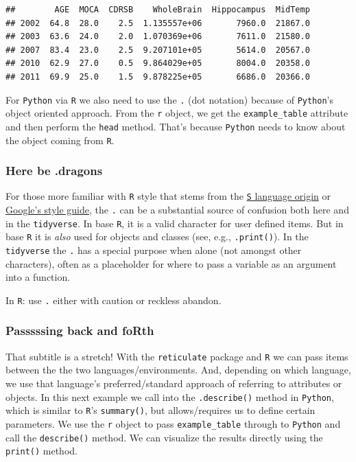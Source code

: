 \documentclass[]{article}
\begin{document}
\begin{verbatim}
##        AGE  MOCA  CDRSB    WholeBrain  Hippocampus  MidTemp
## 2002  64.8  28.0    2.5  1.135557e+06       7960.0  21867.0
## 2003  63.6  24.0    2.0  1.070369e+06       7611.0  21580.0
## 2007  83.4  23.0    2.5  9.207101e+05       5614.0  20567.0
## 2010  62.9  27.0    0.5  9.864029e+05       8004.0  20358.0
## 2011  69.9  25.0    1.5  9.878225e+05       6686.0  20366.0
\end{verbatim}

For \texttt{Python} via \texttt{R} we also need to use the \texttt{.}
(dot notation) because of \texttt{Python}'s object oriented approach.
From the \texttt{r} object, we get the \texttt{example\_table} attribute
and then perform the \texttt{head} method. That's because
\texttt{Python} needs to know about the object coming from \texttt{R}.

\hypertarget{here-be-.dragons}{%
\subsubsection{Here be .dragons}\label{here-be-.dragons}}

For those more familiar with \texttt{R} style that stems from the
\href{}{\texttt{S} language origin} or \href{}{Google's style guide},
the \texttt{.} can be a substantial source of confusion both here and in
the \texttt{tidyverse}. In base \texttt{R}, it is a valid character for
user defined items. But in base \texttt{R} it is \emph{also} used for
objects and classes (see, e.g., \texttt{.print()}). In the
\texttt{tidyverse} the \texttt{.} has a special purpose when alone (not
amongst other characters), often as a placeholder for where to pass a
variable as an argument into a function.

In \texttt{R}: use \texttt{.} either with caution or reckless abandon.

\hypertarget{passsssing-back-and-forth}{%
\subsubsection{Passsssing back and
foRth}\label{passsssing-back-and-forth}}

That subtitle is a stretch! With the \texttt{reticulate} package and
\texttt{R} we can pass items between the the two languages/environments.
And, depending on which language, we use that language's
preferred/standard approach of referring to attributes or objects. In
this next example we call into the \texttt{.describe()} method in
\texttt{Python}, which is similar to \texttt{R}'s \texttt{summary()},
but allows/requires us to define certain parameters. We use the
\texttt{r} object to pass \texttt{example\_table} through to
\texttt{Python} and call the \texttt{describe()} method. We can
visualize the results directly using the \texttt{print()} method.
\end{document}
